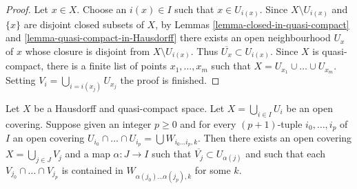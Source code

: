 \begin{proof}
Let $x \in X$. Choose an $i(x) \in I$ such that $x \in U_{i(x)}$.
Since $X \setminus U_{i(x)}$ and $\{x\}$ are disjoint closed
subsets of $X$, by Lemmas \ref{lemma-closed-in-quasi-compact} and
\ref{lemma-quasi-compact-in-Hausdorff}
there exists an open neighbourhood $U_x$ of $x$
whose closure is disjoint from $X \setminus U_{i(x)}$.
Thus $\overline{U_x} \subset U_{i(x)}$. Since $X$ is quasi-compact,
there is a finite list of points $x_1, \ldots, x_m$ such that
$X = U_{x_1} \cup \ldots \cup U_{x_m}$. Setting
$V_i = \bigcup_{i = i(x_j)} U_{x_j}$ the proof is finished.
\end{proof}

\begin{lemma}
\label{lemma-refine-covering}
Let $X$ be a Hausdorff and quasi-compact space.
Let $X = \bigcup_{i \in I} U_i$ be an open covering.
Suppose given an integer $p \geq 0$ and for every $(p + 1)$-tuple
$i_0, \ldots, i_p$ of $I$ an open covering
$U_{i_0} \cap \ldots \cap U_{i_p} = \bigcup W_{i_0 \ldots i_p, k}$.
Then there exists an open covering $X = \bigcup_{j \in J} V_j$
and a map $\alpha : J \to I$ such that $\overline{V_j} \subset U_{\alpha(j)}$
and such that each $V_{j_0} \cap \ldots \cap V_{j_p}$
is contained in $W_{\alpha(j_0) \ldots \alpha(j_p), k}$
for some $k$.
\end{lemma}

